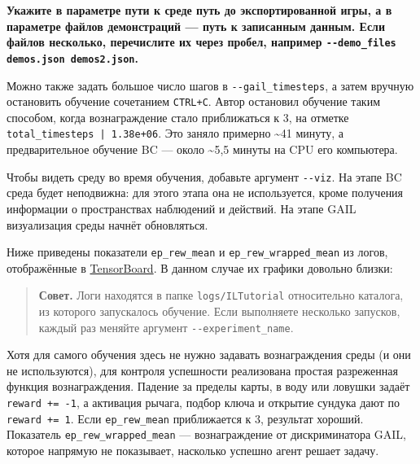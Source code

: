 \documentclass[11pt,a4paper]{article}
\begin{document}
\textbf{Укажите в параметре пути к среде путь до экспортированной игры, а в параметре файлов демонстраций --- путь к записанным данным. Если файлов несколько, перечислите их через пробел, например \passthrough{\lstinline!--demo_files demos.json demos2.json!}.}

Можно также задать большое число шагов в \passthrough{\lstinline!--gail_timesteps!}, а затем вручную остановить обучение сочетанием \passthrough{\lstinline!CTRL+C!}. Автор остановил обучение таким способом, когда вознаграждение стало приближаться к 3, на отметке \passthrough{\lstinline!total_timesteps | 1.38e+06!}. Это заняло примерно \textasciitilde41 минуту, а предварительное обучение BC --- около \textasciitilde5,5 минуты на CPU его компьютера.

Чтобы видеть среду во время обучения, добавьте аргумент \passthrough{\lstinline!--viz!}. На этапе BC среда будет неподвижна: для этого этапа она не используется, кроме получения информации о пространствах наблюдений и действий. На этапе GAIL визуализация среды начнёт обновляться.

Ниже приведены показатели \passthrough{\lstinline!ep_rew_mean!} и \passthrough{\lstinline!ep_rew_wrapped_mean!} из логов, отображённые в \href{https://github.com/edbeeching/godot_rl_agents/blob/main/docs/TRAINING_STATISTICS.md}{TensorBoard}. В данном случае их графики довольно близки:


\begin{quote}
\textbf{Совет.} Логи находятся в папке \passthrough{\lstinline!logs/ILTutorial!} относительно каталога, из которого запускалось обучение. Если выполняете несколько запусков, каждый раз меняйте аргумент \passthrough{\lstinline!--experiment_name!}.
\end{quote}

Хотя для самого обучения здесь не нужно задавать вознаграждения среды (и они не используются), для контроля успешности реализована простая разреженная функция вознаграждения. Падение за пределы карты, в воду или ловушки задаёт \passthrough{\lstinline!reward += -1!}, а активация рычага, подбор ключа и открытие сундука дают по \passthrough{\lstinline!reward += 1!}. Если \passthrough{\lstinline!ep_rew_mean!} приближается к 3, результат хороший. Показатель \passthrough{\lstinline!ep_rew_wrapped_mean!} --- вознаграждение от дискриминатора GAIL, которое напрямую не показывает, насколько успешно агент решает задачу.
\end{document}
